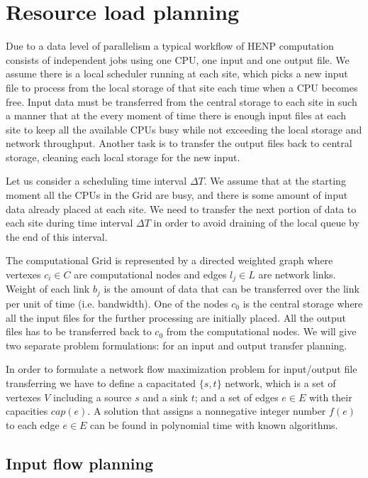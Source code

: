 \documentclass[english]{ddny}
\begin{document}
\section{Resource load planning}
\label{Network_flow}
Due to a data level of parallelism a typical workflow of HENP computation
consists of independent jobs using one CPU, one input and one output file. We
assume there is a local scheduler running at each site, which picks a new
input file to process from the local storage of that site each time when a CPU becomes
free. Input data must be transferred from the central storage
to each site in such a manner that at the every moment of time there is enough
input files at each site to keep all the available CPUs busy while not
exceeding the local storage and network throughput. Another task
is to transfer the output files back to central storage, cleaning each local
storage for the new input.

Let us consider a scheduling time interval $\Delta T$. We assume that at the
starting moment all the CPUs in the Grid are busy, and there is some amount of
input data already placed at each site. We need to transfer the next portion
of data to each site during time interval $\Delta T$ in order to avoid
draining of the local queue by the end of this interval. 

The computational Grid is represented by a directed weighted graph where
vertexes $c_{i} \in C$ are computational nodes and edges $l_{j} \in L$ are
network links. Weight of each link $b_{j}$ is the amount of data that can be
transferred over the link per unit of time (i.e. bandwidth). One of the nodes
$c_{0}$ is the central storage where all the input files for the further
processing are initially placed. All the output files has to be transferred
back to $c_{0}$ from the computational nodes. We will give two separate
problem formulations: for an input and output transfer planning. 

In order to formulate a network flow maximization problem \cite{Network_flows}
for input/output file transferring we have to define a capacitated $\{s,t\}$
network, which is a set of vertexes $V$ including a source $s$ and a sink $t$;
and a set of edges $e\in E$ with their capacities $cap(e)$. A solution that
assigns a nonnegative integer number $f(e)$ to each edge $e \in E$ can be
found in polynomial time with known algorithms.

\subsection{Input flow planning}
\label{inproblem}
\end{document}
